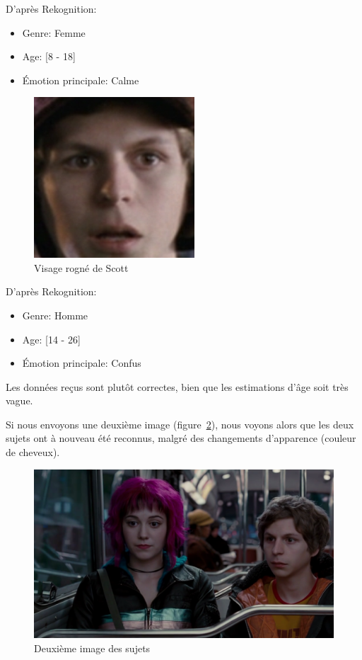 D'après Rekognition:
\begin{itemize}
    \item Genre: Femme
    \item Age: [8 - 18]
    \item Émotion principale: Calme 
\end{itemize}

\begin{figure}[H]
	\centering
	\includegraphics[width=6cm]{images/facial_reco/scott_hidden.png}
    \caption{Visage rogné de Scott}
	\label{fig:hidden_face_scott}
\end{figure}

D'après Rekognition:
\begin{itemize}
    \item Genre: Homme
    \item Age: [14 - 26]
    \item Émotion principale: Confus 
\end{itemize}

Les données reçus sont plutôt correctes, bien que les estimations d'âge soit très vague.

Si nous envoyons une deuxième image (figure~\ref{fig:scott2}), nous voyons alors que les deux sujets ont à nouveau été reconnus, malgré des changements d'apparence (couleur de cheveux).

\begin{figure}[H]
	\centering
	\includegraphics[width=12cm]{images/facial_reco/scott2.png}
    \caption{Deuxième image des sujets}
	\label{fig:scott2}
\end{figure}

